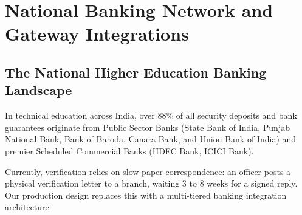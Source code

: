 \documentclass[12pt, a4paper]{report}
\begin{document}
\chapter{National Banking Network and Gateway Integrations}

\section{The National Higher Education Banking Landscape}

In technical education across India, over 88\% of all security deposits and bank guarantees originate from Public Sector Banks (State Bank of India, Punjab National Bank, Bank of Baroda, Canara Bank, and Union Bank of India) and premier Scheduled Commercial Banks (HDFC Bank, ICICI Bank). 

Currently, verification relies on slow paper correspondence: an officer posts a physical verification letter to a branch, waiting 3 to 8 weeks for a signed reply. Our production design replaces this with a multi-tiered banking integration architecture:
\end{document}
